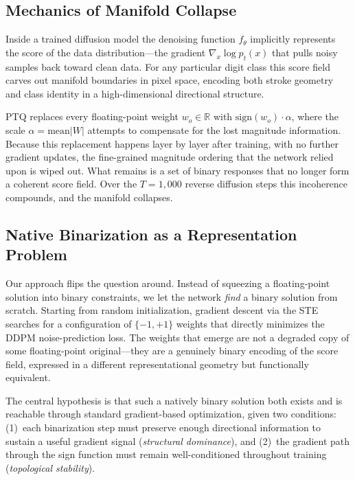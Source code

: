 \documentclass[conference]{IEEEtran}
\begin{document}
\subsection{Mechanics of Manifold Collapse}

Inside a trained diffusion model the denoising function $f_\theta$ implicitly represents
the score of the data distribution---the gradient $\nabla_x \log p_t(x)$ that pulls
noisy samples back toward clean data. For any particular digit class this score field
carves out manifold boundaries in pixel space, encoding both stroke geometry and class
identity in a high-dimensional directional structure.

PTQ replaces every floating-point weight $w_o \in \mathbb{R}$ with
$\text{sign}(w_o)\cdot\alpha$, where the scale
$\alpha = \text{mean}|W|$ attempts to compensate for the lost magnitude information.
Because this replacement happens layer by layer after training, with no further gradient
updates, the fine-grained magnitude ordering that the network relied upon is wiped out.
What remains is a set of binary responses that no longer form a coherent score field.
Over the $T=1{,}000$ reverse diffusion steps this incoherence compounds, and the
manifold collapses.

\subsection{Native Binarization as a Representation Problem}

Our approach flips the question around. Instead of squeezing a floating-point solution
into binary constraints, we let the network \emph{find} a binary solution from scratch.
Starting from random initialization, gradient descent via the STE searches for a
configuration of $\{-1,+1\}$ weights that directly minimizes the DDPM noise-prediction
loss. The weights that emerge are not a degraded copy of some floating-point
original---they are a genuinely binary encoding of the score field, expressed in a
different representational geometry but functionally equivalent.

The central hypothesis is that such a natively binary solution both exists and is
reachable through standard gradient-based optimization, given two conditions:
(1)~each binarization step must preserve enough directional information to sustain a
useful gradient signal (\emph{structural dominance}), and (2)~the gradient path through
the sign function must remain well-conditioned throughout training (\emph{topological
stability}).
\end{document}
